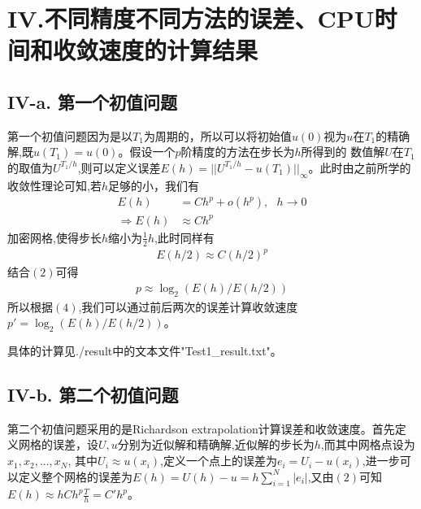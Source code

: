 \documentclass[twoside,a4paper]{article}
\begin{document}
\newpage
\section*{IV.不同精度不同方法的误差、CPU时间和收敛速度的计算结果}
\subsection*{IV-a. 第一个初值问题}
\hspace{0.8em}
第一个初值问题因为是以$T_1$为周期的，所以可以将初始值$u(0)$视为$u$在$T_1$的精确解,既$u(T_1)=u(0)$。假设一个$p$阶精度的方法在步长为$h$所得到的
数值解$U$在$T_1$的取值为$U^{T_1/h}$,则可以定义误差$E(h)=||U^{T_1/h}-u(T_1)||_{\infty}$。此时由之前所学的收敛性理论可知,若$h$足够的小，我们有
\begin{align}
    E(h)              & =Ch^p+o(h^p),\ \ \  h \rightarrow 0 \\
    \Rightarrow  E(h) & \approx Ch^p
\end{align}
加密网格,使得步长$h$缩小为$\frac{1}{2}h$,此时同样有
\begin{align}
    E(h/2) \approx C(h/2)^p
\end{align}
结合$(2)$可得
\begin{align}
    p\approx \log_2(E(h)/E(h/2))
\end{align}
所以根据$(4)$,我们可以通过前后两次的误差计算收敛速度$p'=\log_2(E(h)/E(h/2))$。

具体的计算见./result中的文本文件"Test1\_result.txt"。

\subsection*{IV-b. 第二个初值问题}
\hspace{0.8em}
第二个初值问题采用的是Richardson extrapolation计算误差和收敛速度。首先定义网格的误差，设$U,u$分别为近似解和精确解,近似解的步长为$h$,而其中网格点设为$x_1,x_2,...,x_N$,
其中$U_i\approx u(x_i)$,定义一个点上的误差为$e_i=U_i-u(x_i)$,进一步可以定义整个网格的误差为$E(h)=U(h)-u=h\sum\limits_{i=1}^N|e_i|$,又由$(2)$可知$E(h)\approx hCh^p\frac{T}{h}=C'h^p$。
\end{document}
